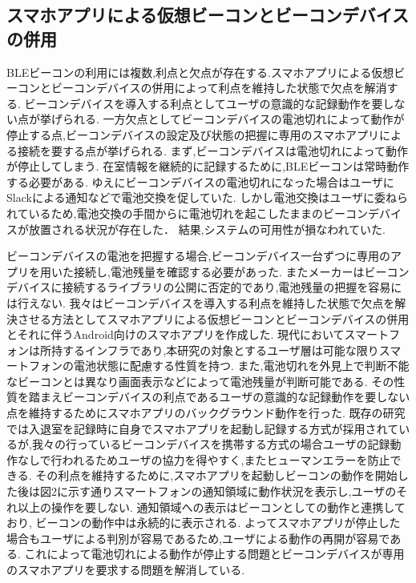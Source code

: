 
\subsection{スマホアプリによる仮想ビーコンとビーコンデバイスの併用}



 BLEビーコンの利用には複数,利点と欠点が存在する.スマホアプリによる仮想ビーコンとビーコンデバイスの併用によって利点を維持した状態で欠点を解消する.
 ビーコンデバイスを導入する利点としてユーザの意識的な記録動作を要しない点が挙げられる.
一方欠点としてビーコンデバイスの電池切れによって動作が停止する点,ビーコンデバイスの設定及び状態の把握に専用のスマホアプリによる接続を要する点が挙げられる.
まず,ビーコンデバイスは電池切れによって動作が停止してしまう.
在室情報を継続的に記録するために,BLEビーコンは常時動作する必要がある.
ゆえにビーコンデバイスの電池切れになった場合はユーザにSlackによる通知などで電池交換を促していた.
しかし電池交換はユーザに委ねられているため,電池交換の手間からに電池切れを起こしたままのビーコンデバイスが放置される状況が存在した．
結果,システムの可用性が損なわれていた.

 ビーコンデバイスの電池を把握する場合,ビーコンデバイス一台ずつに専用のアプリを用いた接続し,電池残量を確認する必要があった.
またメーカーはビーコンデバイスに接続するライブラリの公開に否定的であり,電池残量の把握を容易には行えない.
我々はビーコンデバイスを導入する利点を維持した状態で欠点を解決させる方法としてスマホアプリによる仮想ビーコンとビーコンデバイスの併用とそれに伴うAndroid向けのスマホアプリを作成した.
 現代においてスマートフォンは所持するインフラであり,本研究の対象とするユーザ層は可能な限りスマートフォンの電池状態に配慮する性質を持つ.
また,電池切れを外見上で判断不能なビーコンとは異なり画面表示などによって電池残量が判断可能である.
その性質を踏まえビーコンデバイスの利点であるユーザの意識的な記録動作を要しない点を維持するためにスマホアプリのバックグラウンド動作を行った.
 既存の研究では入退室を記録時に自身でスマホアプリを起動し記録する方式が採用されているが,我々の行っているビーコンデバイスを携帯する方式の場合ユーザの記録動作なしで行われるためユーザの協力を得やすく,またヒューマンエラーを防止できる.
その利点を維持するために,スマホアプリを起動しビーコンの動作を開始した後は図2に示す通りスマートフォンの通知領域に動作状況を表示し,ユーザのそれ以上の操作を要しない.
通知領域への表示はビーコンとしての動作と連携しており, ビーコンの動作中は永続的に表示される.
よってスマホアプリが停止した場合もユーザによる判別が容易であるため,ユーザによる動作の再開が容易である.
これによって電池切れによる動作が停止する問題とビーコンデバイスが専用のスマホアプリを要求する問題を解消している.

